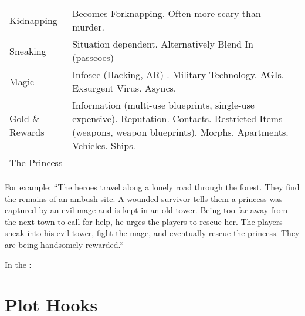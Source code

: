 \documentclass[a4]{article}
\begin{document}
\begin{xtabular}{|p{.35\columnwidth}|p{.55\columnwidth}|}
    Kidnapping & Becomes Forknapping. Often more scary than murder. \\
    Sneaking & Situation dependent. Alternatively Blend In (passcoes)  \\
    Magic & Infosec (Hacking, AR) . Military Technology. AGIs. Exsurgent Virus. Asyncs. \\
    Gold \& Rewards & Information (multi-use blueprints, single-use expensive). Reputation. Contacts. Restricted Items (weapons, weapon blueprints). Morphs. Apartments. Vehicles. Ships.\\
    The Princess &  \\
\end{xtabular}%

\medskip

For example:
``The heroes travel along a lonely road through the forest.
They find the remains of an ambush site.
A wounded survivor tells them a princess was captured by an evil mage and is kept in an old tower.
Being too far away from the next town to call for help, he urges the players to rescue her.
The players sneak into his evil tower, fight the mage, and eventually rescue the princess.
They are being handsomely rewarded.``

In the \eclipsephase:


\section{Plot Hooks}
\end{document}
